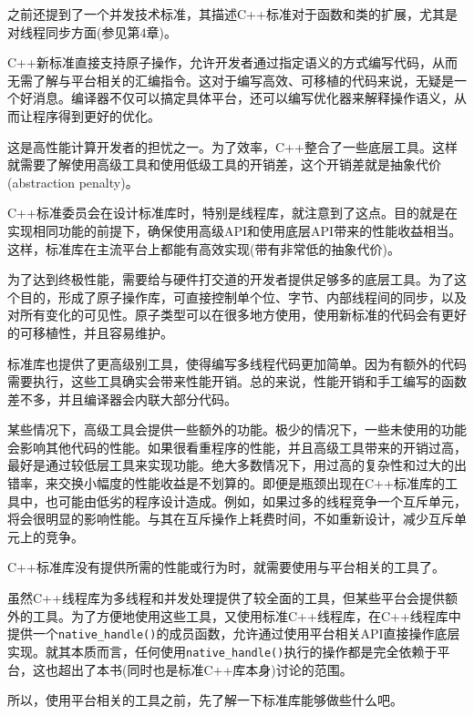 之前还提到了一个并发技术标准，其描述C++标准对于函数和类的扩展，尤其是对线程同步方面(参见第4章)。

C++新标准直接支持原子操作，允许开发者通过指定语义的方式编写代码，从而无需了解与平台相关的汇编指令。这对于编写高效、可移植的代码来说，无疑是一个好消息。编译器不仅可以搞定具体平台，还可以编写优化器来解释操作语义，从而让程序得到更好的优化。


这是高性能计算开发者的担忧之一。为了效率，C++整合了一些底层工具。这样就需要了解使用高级工具和使用低级工具的开销差，这个开销差就是抽象代价(abstraction penalty)。

C++标准委员会在设计标准库时，特别是线程库，就注意到了这点。目的就是在实现相同功能的前提下，确保使用高级API和使用底层API带来的性能收益相当。这样，标准库在主流平台上都能有高效实现(带有非常低的抽象代价)。

为了达到终极性能，需要给与硬件打交道的开发者提供足够多的底层工具。为了这个目的，形成了原子操作库，可直接控制单个位、字节、内部线程间的同步，以及对所有变化的可见性。原子类型可以在很多地方使用，使用新标准的代码会有更好的可移植性，并且容易维护。

标准库也提供了更高级别工具，使得编写多线程代码更加简单。因为有额外的代码需要执行，这些工具确实会带来性能开销。总的来说，性能开销和手工编写的函数差不多，并且编译器会内联大部分代码。

某些情况下，高级工具会提供一些额外的功能。极少的情况下，一些未使用的功能会影响其他代码的性能。如果很看重程序的性能，并且高级工具带来的开销过高，最好是通过较低层工具来实现功能。绝大多数情况下，用过高的复杂性和过大的出错率，来交换小幅度的性能收益是不划算的。即便是瓶颈出现在C++标准库的工具中，也可能由低劣的程序设计造成。例如，如果过多的线程竞争一个互斥单元，将会很明显的影响性能。与其在互斥操作上耗费时间，不如重新设计，减少互斥单元上的竞争。

C++标准库没有提供所需的性能或行为时，就需要使用与平台相关的工具了。


虽然C++线程库为多线程和并发处理提供了较全面的工具，但某些平台会提供额外的工具。为了方便地使用这些工具，又使用标准C++线程库，在C++线程库中提供一个\texttt{native\_handle()}的成员函数，允许通过使用平台相关API直接操作底层实现。就其本质而言，任何使用\texttt{native\_handle()}执行的操作都是完全依赖于平台，这也超出了本书(同时也是标准C++库本身)讨论的范围。

所以，使用平台相关的工具之前，先了解一下标准库能够做些什么吧。